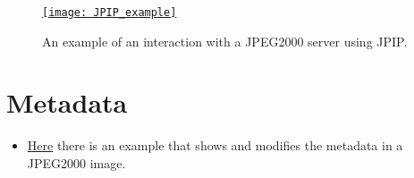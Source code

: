 \begin{figure}[H]
  \vspace{-1ex}
  \centering
  \href{https://ieeexplore.ieee.org/document/7214293}{\texttt{[image: JPIP\_example]}}
  \caption{An example of an interaction with a JPEG2000 server using \gls{JPIP}.}
  \label{fig:J2K_motion}
\end{figure}

\section{Metadata}
\begin{itemize}
\item
  \href{https://github.com/vicente-gonzalez-ruiz/medical_imaging/blob/main/notebooks/JPEG2000_add_metadata.ipynb}{Here}
  there is an example that shows and modifies the metadata in a JPEG2000
  image.
\end{itemize}
